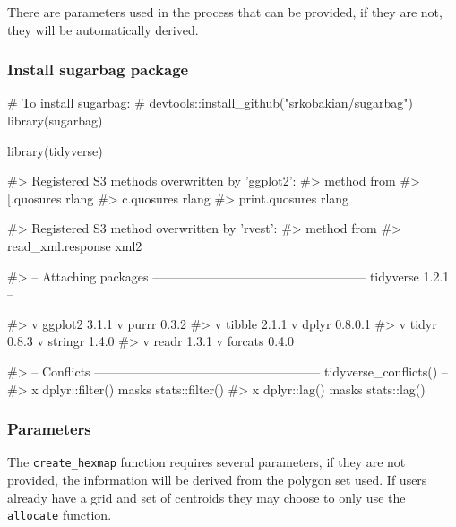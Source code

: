 There are parameters used in the process that can be provided, if they
are not, they will be automatically derived.

\hypertarget{install-sugarbag-package}{%
\subsubsection{Install sugarbag
package}\label{install-sugarbag-package}}

\begin{Schunk}
\begin{Sinput}
# To install sugarbag:
# devtools::install_github("srkobakian/sugarbag")
library(sugarbag)

library(tidyverse)
\end{Sinput}
\begin{Soutput}
#> Registered S3 methods overwritten by 'ggplot2':
#>   method         from 
#>   [.quosures     rlang
#>   c.quosures     rlang
#>   print.quosures rlang
\end{Soutput}
\begin{Soutput}
#> Registered S3 method overwritten by 'rvest':
#>   method            from
#>   read_xml.response xml2
\end{Soutput}
\begin{Soutput}
#> -- Attaching packages --------------------------------------------------- tidyverse 1.2.1 --
\end{Soutput}
\begin{Soutput}
#> v ggplot2 3.1.1       v purrr   0.3.2  
#> v tibble  2.1.1       v dplyr   0.8.0.1
#> v tidyr   0.8.3       v stringr 1.4.0  
#> v readr   1.3.1       v forcats 0.4.0
\end{Soutput}
\begin{Soutput}
#> -- Conflicts ------------------------------------------------------ tidyverse_conflicts() --
#> x dplyr::filter() masks stats::filter()
#> x dplyr::lag()    masks stats::lag()
\end{Soutput}
\end{Schunk}

\hypertarget{parameters}{%
\subsubsection{Parameters}\label{parameters}}

The \texttt{create\_hexmap} function requires several parameters, if
they are not provided, the information will be derived from the polygon
set used. If users already have a grid and set of centroids they may
choose to only use the \texttt{allocate} function.

